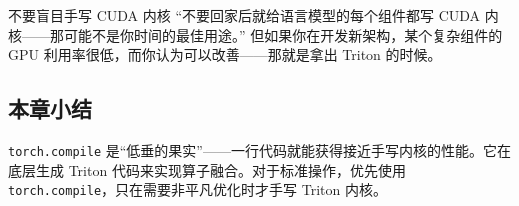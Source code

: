 \begin{warningbox}{不要盲目手写 CUDA 内核}
``不要回家后就给语言模型的每个组件都写 CUDA 内核——那可能不是你时间的最佳用途。'' 但如果你在开发新架构，某个复杂组件的 GPU 利用率很低，而你认为可以改善——那就是拿出 Triton 的时候。
\end{warningbox}

\subsection{本章小结}

\texttt{torch.compile} 是``低垂的果实''——一行代码就能获得接近手写内核的性能。它在底层生成 Triton 代码来实现算子融合。对于标准操作，优先使用 \texttt{torch.compile}，只在需要非平凡优化时才手写 Triton 内核。


